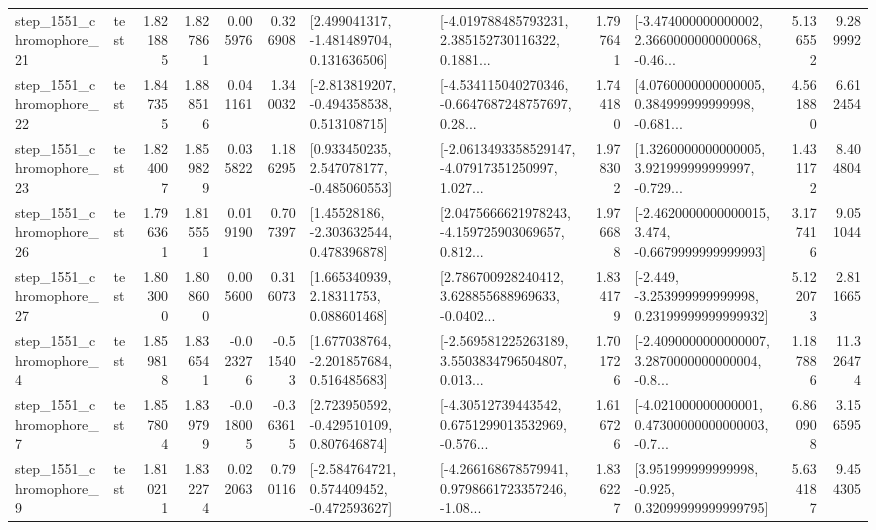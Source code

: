 \begin{tabular}{llrrrrllrlrr}
 step\_1551\_chromophore\_21 &      test &      1.821885 &    1.827861 &      0.005976 &  0.326908 &    [2.499041317, -1.481489704, 0.131636506] &  [-4.019788485793231, 2.385152730116322, 0.1881... &       1.797641 &  [-3.474000000000002, 2.3660000000000068, -0.46... &            5.136552 &          9.289992 \\
 step\_1551\_chromophore\_22 &      test &      1.847355 &    1.888516 &      0.041161 &  1.340032 &   [-2.813819207, -0.494358538, 0.513108715] &  [-4.534115040270346, -0.6647687248757697, 0.28... &       1.744180 &  [4.0760000000000005, 0.384999999999998, -0.681... &            4.561880 &          6.612454 \\
 step\_1551\_chromophore\_23 &      test &      1.824007 &    1.859829 &      0.035822 &  1.186295 &    [0.933450235, 2.547078177, -0.485060553] &  [-2.0613493358529147, -4.07917351250997, 1.027... &       1.978302 &  [1.3260000000000005, 3.921999999999997, -0.729... &            1.431172 &          8.404804 \\
 step\_1551\_chromophore\_26 &      test &      1.796361 &    1.815551 &      0.019190 &  0.707397 &     [1.45528186, -2.303632544, 0.478396878] &  [2.0475666621978243, -4.159725903069657, 0.812... &       1.976688 &  [-2.4620000000000015, 3.474, -0.6679999999999993] &            3.177416 &          9.051044 \\
 step\_1551\_chromophore\_27 &      test &      1.803000 &    1.808600 &      0.005600 &  0.316073 &      [1.665340939, 2.18311753, 0.088601468] &  [2.786700928240412, 3.628855688969633, -0.0402... &       1.834179 &  [-2.449, -3.253999999999998, 0.23199999999999932] &            5.122073 &          2.811665 \\
  step\_1551\_chromophore\_4 &      test &      1.859818 &    1.836541 &     -0.023276 & -0.515403 &    [1.677038764, -2.201857684, 0.516485683] &  [-2.569581225263189, 3.5503834796504807, 0.013... &       1.701726 &  [-2.4090000000000007, 3.2870000000000004, -0.8... &            1.187886 &         11.326474 \\
  step\_1551\_chromophore\_7 &      test &      1.857804 &    1.839799 &     -0.018005 & -0.363615 &    [2.723950592, -0.429510109, 0.807646874] &  [-4.30512739443542, 0.6751299013532969, -0.576... &       1.616726 &  [-4.021000000000001, 0.47300000000000003, -0.7... &            6.860908 &          3.156595 \\
  step\_1551\_chromophore\_9 &      test &      1.810211 &    1.832274 &      0.022063 &  0.790116 &   [-2.584764721, 0.574409452, -0.472593627] &  [-4.266168678579941, 0.9798661723357246, -1.08... &       1.836227 &   [3.951999999999998, -0.925, 0.32099999999999795] &            5.634187 &          9.454305 \\

\end{tabular}
